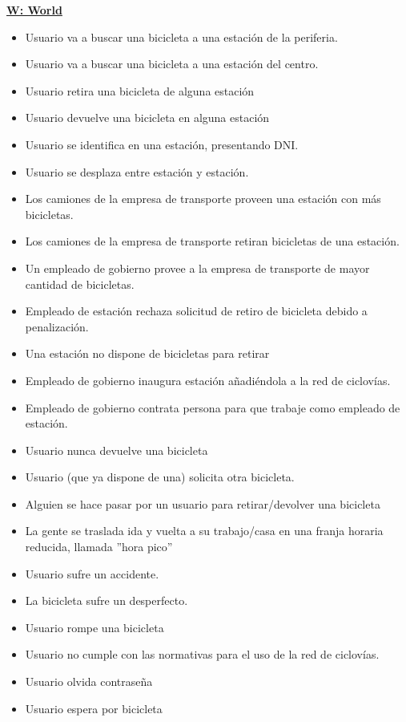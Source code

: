 \vspace{1cm}
\textbf{\underline{W: World}}

\begin{itemize}
\item Usuario va a buscar una bicicleta a una estación de la periferia.
\item Usuario va a buscar una bicicleta a una estación del centro.
\item Usuario retira una bicicleta de alguna estación
\item Usuario devuelve una bicicleta en alguna estación
\item Usuario se identifica en una estación, presentando DNI.
\item Usuario se desplaza entre estación y estación.
\item Los camiones de la empresa de transporte proveen una estación con más bicicletas.
\item Los camiones de la empresa de transporte retiran bicicletas de una estación.
\item Un empleado de gobierno provee a la empresa de transporte de mayor cantidad de bicicletas.
\item Empleado de estación rechaza solicitud de retiro de bicicleta debido a penalización.
\item Una estación no dispone de bicicletas para retirar
\item Empleado de gobierno inaugura estación añadiéndola a la red de ciclovías.
\item Empleado de gobierno contrata persona para que trabaje como empleado de estación.
\item Usuario nunca devuelve una bicicleta
\item Usuario (que ya dispone de una) solicita otra bicicleta.
\item Alguien se hace pasar por un usuario para retirar/devolver una bicicleta
\item La gente se traslada ida y vuelta a su trabajo/casa en una franja horaria reducida, llamada ''hora pico''
\item Usuario sufre un accidente.
\item La bicicleta sufre un desperfecto.
\item Usuario rompe una bicicleta
\item Usuario no cumple con las normativas para el uso de la red de ciclovías.
\item Usuario olvida contraseña
\item Usuario espera por bicicleta

\end{itemize}
